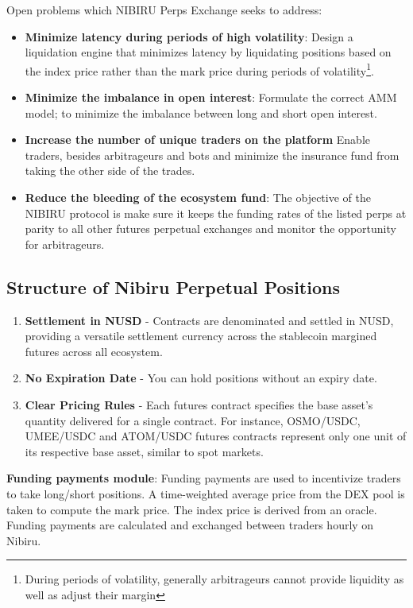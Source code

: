 \documentclass[11pt]{article}
\begin{document}
Open problems which NIBIRU Perps Exchange seeks to address:
\begin{itemize}
\item \textbf{Minimize latency during periods of high volatility}: Design a liquidation engine that minimizes latency by liquidating positions based on the index price rather than the mark price during periods of volatility\footnote{During periods of volatility, generally arbitrageurs cannot provide liquidity as well as adjust their margin}. 
\item \textbf{Minimize the imbalance in open interest}: Formulate the correct AMM model; to minimize the imbalance between long and short open interest.
\item \textbf{Increase the number of unique traders on the platform} Enable traders, besides arbitrageurs and bots and minimize the insurance fund from taking the other side of the trades.
\item \textbf{Reduce the bleeding of the ecosystem fund}: The objective of the NIBIRU protocol is make sure it keeps the funding rates of the listed perps at parity to all other futures perpetual exchanges and monitor the opportunity for arbitrageurs. 
\end{itemize}


\subsection*{Structure of Nibiru Perpetual Positions}

\begin{enumerate}
\item \textbf{Settlement in NUSD} - Contracts are denominated and settled in NUSD, providing a versatile settlement currency across the stablecoin margined futures across all ecosystem.
\item \textbf{No Expiration Date} - You can hold positions without an expiry date. 
\item \textbf{Clear Pricing Rules} - Each futures contract specifies the base asset's quantity delivered for a single contract. For instance, OSMO/USDC, UMEE/USDC and ATOM/USDC futures contracts represent only one unit of its respective base asset, similar to spot markets. 
\end{enumerate}

\textbf{Funding payments module}: Funding payments are used to incentivize traders to take long/short positions. A time-weighted average price from the DEX pool is taken to compute the mark price. The index price is derived from an oracle. Funding payments are calculated and exchanged between traders hourly on Nibiru.
\end{document}
